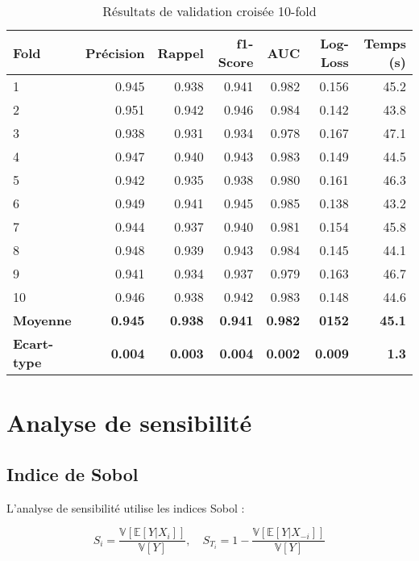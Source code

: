 \begin{table}[H]
	\centering
	\caption{Résultats de validation croisée 10-fold}
	\begin{tabular}{lrrrrrr}
		\toprule
		\textbf{Fold} & \textbf{Précision} & \textbf{Rappel} & \textbf{f1-Score} & \textbf{AUC} & \textbf{Log-Loss} & \textbf{Temps (s)} \\
		\midrule
		\midrule
		1 & 0.945 & 0.938 & 0.941 & 0.982 & 0.156 & 45.2 \\
		2 & 0.951 & 0.942 & 0.946 & 0.984 & 0.142 & 43.8 \\
		3 & 0.938 & 0.931 & 0.934 & 0.978 & 0.167 & 47.1 \\
		4 & 0.947 & 0.940 & 0.943 & 0.983 & 0.149 & 44.5 \\
		5 & 0.942 & 0.935 & 0.938 & 0.980 & 0.161 & 46.3 \\
		6 & 0.949 & 0.941 & 0.945 & 0.985 & 0.138 & 43.2 \\
		7 & 0.944 & 0.937 & 0.940 & 0.981 & 0.154 & 45.8 \\
		8 & 0.948 & 0.939 & 0.943 & 0.984 & 0.145 & 44.1 \\
		9 & 0.941 & 0.934 & 0.937 & 0.979 & 0.163 & 46.7 \\
		10 & 0.946 & 0.938 & 0.942 & 0.983 & 0.148 & 44.6 \\
		\hline
		\textbf{Moyenne} & \textbf{0.945} & \textbf{0.938} & \textbf{0.941} & \textbf{0.982} & \textbf{0152} & \textbf{45.1} \\
		\textbf{Ecart-type} & \textbf{0.004} & \textbf{0.003} & \textbf{0.004} & \textbf{0.002} & \textbf{0.009} & \textbf{1.3} \\
		\bottomrule
	\end{tabular}
	\label{tab: cros-validation}
\end{table}

\section{Analyse de sensibilité}

\subsection{Indice de Sobol}

L'analyse de sensibilité utilise les indices Sobol : 

\begin{equation}
	S_i = \frac{\mathbb{V}[\mathbb{E}[Y|X_i]]}{\mathbb{V}[Y]}, \quad S_{T_i} = 1 - \frac{\mathbb{V}[\mathbb{E}[Y|X_{-i}]]}{\mathbb{V}[Y]}
	\label{eq:sobol-indices}
\end{equation}


